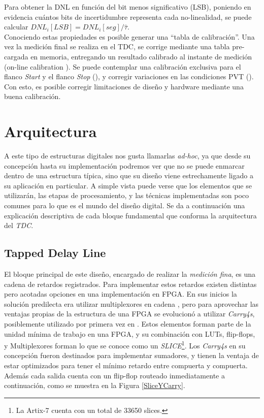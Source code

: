 Para obtener la DNL en función del bit menos significativo (LSB), poniendo 
en evidencia cuántos bits de incertidumbre representa cada no-linealidad, 
se puede calcular $DNL_i[LSB] = DNL_i[seg] / \hat{\tau}$.\\
Conociendo estas propiedades es posible generar una ``tabla de calibración''. Una vez la medición final
se realiza en el TDC, se corrige mediante una tabla pre-cargada en memoria, entregando un resultado
calibrado al instante de medición (on-line calibration \cite{Liu2015}). Se puede contemplar
una calibración exclusiva para el flanco \textit{Start} y el flanco \textit{Stop} (\cite{Khaddour2023}), y 
corregir variaciones en las condiciones PVT (\cite{Qin2017}).
Con esto, es posible corregir limitaciones de diseño y hardware mediante una buena calibración.\\

\section{Arquitectura}

A este tipo de estructuras digitales nos gusta llamarlas \textit{ad-hoc}, ya que desde su concepción hasta su
implementación podremos ver que no se puede enmarcar dentro de una estructura típica, sino que su diseño viene estrechamente ligado
a su aplicación en particular. A simple vista puede verse que los elementos que se utilizarán, las etapas de procesamiento,
y las técnicas implementadas son poco comunes para lo que es el mundo del diseño digital. Se da a continuación 
una explicación descriptiva de cada bloque fundamental que conforma la arquitectura del \textit{TDC}.

\subsection{Tapped Delay Line}
El bloque principal de este diseño, encargado de realizar la \textit{medición fina}, es una cadena de retardos registrados.
Para implementar estos retardos existen distintas pero acotadas opciones en una implementación en FPGA. En sus
inicios la solución predilecta era utilizar multiplexores en cadena \cite{kalisz_field-programmable-gate-array-based_1997},
pero para aprovechar las ventajas propias de la estructura de una FPGA se evolucionó a utilizar
\textit{Carry4s}, posiblemente utilizado por primera vez en \cite{favi_17ps_2009}. Estos elementos
forman parte de la unidad mínima de trabajo en una FPGA, y su combinación con LUTs, flip-flops, y Multiplexores forman lo que 
se conoce como un \textit{SLICE}\footnote[1]{La Artix-7 cuenta con un total de 33650 slices.}. 
Los \textit{Carry4s} en su concepción fueron destinados para implementar sumadores, y tienen la ventaja de estar optimizados
para tener el mínimo retardo entre compuerta y compuerta. Además cada salida cuenta con un flip-flop routeado inmediatamente
a continuación, como se muestra en la Figura \ref{SliceYCarry}.


